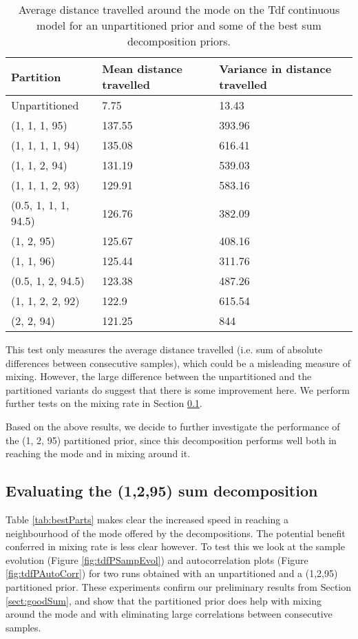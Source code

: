 \begin{table}[h]
  \centering
  \begin{tabular}{lll}
    \toprule
    Partition & Mean distance travelled & Variance in distance travelled \\
    \midrule
    Unpartitioned & 7.75 & 13.43 \\
    (1, 1, 1, 95) & 137.55 & 393.96 \\
    (1, 1, 1, 1, 94) & 135.08 & 616.41 \\
    (1, 1, 2, 94) & 131.19 & 539.03 \\
    (1, 1, 1, 2, 93) & 129.91 & 583.16 \\
    (0.5, 1, 1, 1, 94.5) & 126.76 & 382.09 \\
    (1, 2, 95) & 125.67 & 408.16 \\
    (1, 1, 96) & 125.44 & 311.76 \\
    (0.5, 1, 2, 94.5) & 123.38 & 487.26 \\
    (1, 1, 2, 2, 92) & 122.9 & 615.54 \\
    (2, 2, 94) & 121.25 & 844 \\
    \bottomrule
  \end{tabular}
  \caption{Average distance travelled around the mode on the Tdf continuous model for an unpartitioned prior and some of the best sum decomposition priors.}
  \label{tab:partMix}
\end{table}

This test only measures the average distance travelled (i.e. sum of absolute differences between consecutive samples), which could be a misleading measure of mixing. However, the large difference between the unpartitioned and the partitioned variants do suggest that there is some improvement here. We perform further tests on the mixing rate in Section \ref{sect:1295Eval}.

Based on the above results, we decide to further investigate the performance of the (1, 2, 95) partitioned prior, since this decomposition performs well both in reaching the mode and in mixing around it.

\subsection{Evaluating the (1,2,95) sum decomposition}
\label{sect:1295Eval}

Table \ref{tab:bestParts} makes clear the increased speed in reaching a neighbourhood of the mode offered by the decompositions. The potential benefit conferred in mixing rate is less clear however. To test this we look at the sample evolution (Figure \ref{fig:tdfPSampEvol}) and autocorrelation plots (Figure \ref{fig:tdfPAutoCorr}) for two runs obtained with an unpartitioned and a (1,2,95) partitioned prior. These experiments confirm our preliminary results from Section \ref{sect:goodSum}, and show that the partitioned prior does help with mixing around the mode and with eliminating large correlations between consecutive samples. 

